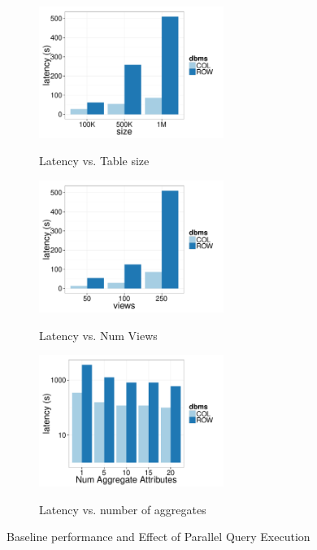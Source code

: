 \begin{figure}[t]
	\centering
	\begin{subfigure}{0.33\linewidth}
		{\includegraphics[width=6cm] {Images/baselines_by_size.pdf}}
		\caption{Latency vs. Table size}
		\label{fig:baseline_size}
	\end{subfigure}
	\begin{subfigure}{0.33\linewidth}
		\centering
		{\includegraphics[width=6cm] {Images/baselines_by_views.pdf}}
		\caption{Latency vs. Num Views}
		\label{fig:baseline_views}
	\end{subfigure}
	\begin{subfigure}{0.33\linewidth}
		{\includegraphics[width=6cm] {Images/multi_agg.pdf}}
		\caption{Latency vs. number of aggregates}
		\label{fig:multi_agg}
	\end{subfigure}
	\vspace{-10pt}
	\caption{Baseline performance and Effect of Parallel Query Execution }
	\vspace{-10pt}
	\label{fig:bank_perf}
\end{figure}


